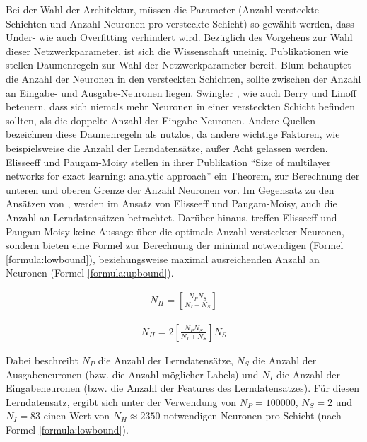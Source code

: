 Bei der Wahl der Architektur, müssen die Parameter (Anzahl versteckte Schichten und Anzahl Neuronen pro versteckte Schicht) so gewählt werden, dass Under- wie auch Overfitting verhindert wird. Bezüglich des Vorgehens zur Wahl dieser Netzwerkparameter, ist sich die Wissenschaft uneinig. Publikationen wie \cite{Blum92, Swingler96, Berry97} stellen Daumenregeln zur Wahl der Netzwerkparameter bereit. Blum behauptet \cite{Blum92} die Anzahl der Neuronen in den versteckten Schichten, sollte zwischen der Anzahl an Eingabe- und Ausgabe-Neuronen liegen. Swingler \cite{Swingler96}, wie auch Berry und Linoff \cite{Berry97} beteuern, dass sich niemals mehr Neuronen in einer versteckten Schicht befinden sollten, als die doppelte Anzahl der Eingabe-Neuronen. Andere Quellen \cite{FAQ14} bezeichnen diese Daumenregeln als nutzlos, da andere wichtige Faktoren, wie beispielsweise die Anzahl der Lerndatensätze, außer Acht gelassen werden. Elisseeff und Paugam-Moisy stellen in ihrer Publikation "`Size of multilayer networks for exact learning: analytic approach"' \cite{EPM97} ein Theorem, zur Berechnung der unteren und oberen Grenze der Anzahl Neuronen vor. Im Gegensatz zu den Ansätzen von \cite{Blum92, Swingler96, Berry97}, werden im Ansatz von Elisseeff und Paugam-Moisy, auch die Anzahl an Lerndatensätzen betrachtet. Darüber hinaus, treffen Elisseeff und Paugam-Moisy keine Aussage über die optimale Anzahl versteckter Neuronen, sondern bieten eine Formel zur Berechnung der minimal notwendigen (Formel \ref{formula:lowbound}), beziehungsweise maximal ausreichenden Anzahl an Neuronen (Formel \ref{formula:upbound}). 

\begin{align}
\label{formula:lowbound}
 N_{H} = \left[\frac{N_{P}N_{S}}{N_{I}+N_{S}} \right] 
\end{align}

\begin{align}
\label{formula:upbound}
 N_{H} = 2\left[\frac{N_{P}N_{S}}{N_{I}+N_{S}} \right]N_{S}
\end{align}   

Dabei beschreibt $N_{P}$ die Anzahl der Lerndatensätze, $N_{S}$ die Anzahl der Ausgabeneuronen (bzw. die Anzahl möglicher Labels) und $N_{I}$ die Anzahl der Eingabeneuronen (bzw. die Anzahl der Features des Lerndatensatzes). Für diesen Lerndatensatz, ergibt sich unter der Verwendung von $N_{P} = 100000$, $N_{S} = 2$ und $N_{I} = 83$ einen Wert von $N_{H}\approx2350$ notwendigen Neuronen pro Schicht (nach Formel \ref{formula:lowbound}).  

